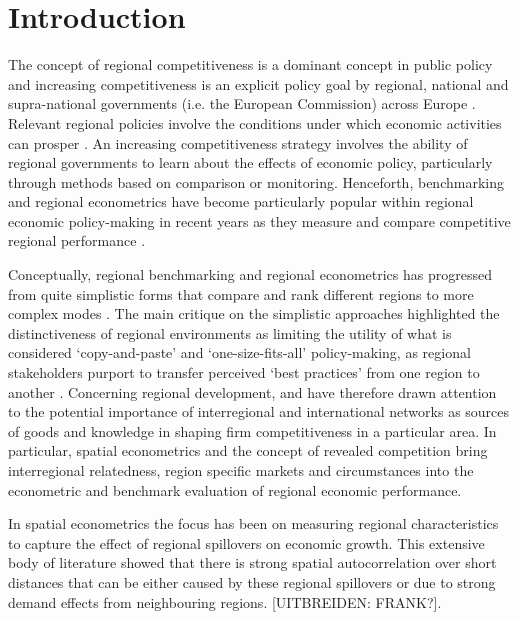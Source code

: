 \documentclass[11pt,parskip,abstracton,notitlepage, paper=a4]{scrartcl}
\begin{document}
\section{Introduction}

The concept of regional competitiveness is a dominant concept in public policy \citep{Bristow2005} and increasing competitiveness is an explicit policy goal by regional, national and supra-national governments (i.e. the European Commission) across Europe \citep{baldwin2009european}. Relevant regional policies involve the conditions under which economic activities can prosper \citep{Bristow2010}. An increasing competitiveness strategy involves the ability of regional governments to learn about the effects of economic policy, particularly through methods based on comparison or monitoring. Henceforth, benchmarking and regional econometrics have become particularly popular within regional economic policy-making in recent years \citep{huggins2010regional} as they measure and compare competitive regional performance \citep{beaudry2009s,DeGroot2009a,melo2009meta}. 

Conceptually, regional benchmarking and regional econometrics has progressed from quite simplistic forms that compare and rank different regions to more complex modes \citep[see][p. 642, with respect to benchmarking]{huggins2010regional}. The main critique on the simplistic approaches highlighted the distinctiveness of regional environments as limiting the utility of what is considered ‘copy-and-paste’ and ‘one-size-fits-all’ policy-making, as regional stakeholders purport to transfer perceived ‘best practices’ from one region to another \citep{huggins2010regional}. Concerning regional development, \citet{malecki2002hard} and \citet{tracey2003alliances} have therefore drawn attention to the potential importance of interregional and international networks as sources of goods and knowledge in shaping firm competitiveness in a particular area. In particular, spatial econometrics and the concept of revealed competition \citep{thissen2013regional} bring interregional relatedness, region specific markets and circumstances into the econometric and benchmark evaluation of regional economic performance. 

In spatial econometrics the focus has been on measuring regional characteristics to capture the effect of regional spillovers on economic growth. This extensive body of literature showed that there is strong spatial autocorrelation over short distances that can be either caused by these regional spillovers or due to strong demand effects from neighbouring regions. [UITBREIDEN: FRANK?]. \citep[see, e.g.,][]{dall2003regional, le2006evaluating, le2008spatial}
\end{document}
